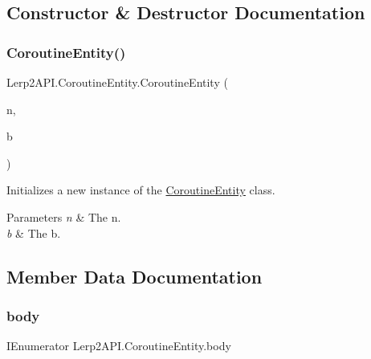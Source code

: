 \subsection{Constructor \& Destructor Documentation}
\mbox{\label{class_lerp2_a_p_i_1_1_coroutine_entity_ab25292f23b6ac11c0308b63dfaa3248d}} 
\subsubsection{\texorpdfstring{Coroutine\+Entity()}{CoroutineEntity()}}
{\footnotesize\ttfamily Lerp2\+A\+P\+I.\+Coroutine\+Entity.\+Coroutine\+Entity (\begin{DoxyParamCaption}\item[{string}]{n,  }\item[{I\+Enumerator}]{b }\end{DoxyParamCaption})\hspace{0.3cm}{\ttfamily [inline]}}



Initializes a new instance of the \hyperlink{class_lerp2_a_p_i_1_1_coroutine_entity}{Coroutine\+Entity} class. 


\begin{DoxyParams}{Parameters}
{\em n} & The n.\\
\hline
{\em b} & The b.\\
\hline
\end{DoxyParams}


\subsection{Member Data Documentation}
\mbox{\label{class_lerp2_a_p_i_1_1_coroutine_entity_a8222c08002c9acac83565f51135012bb}} 
\subsubsection{\texorpdfstring{body}{body}}
{\footnotesize\ttfamily I\+Enumerator Lerp2\+A\+P\+I.\+Coroutine\+Entity.\+body}




